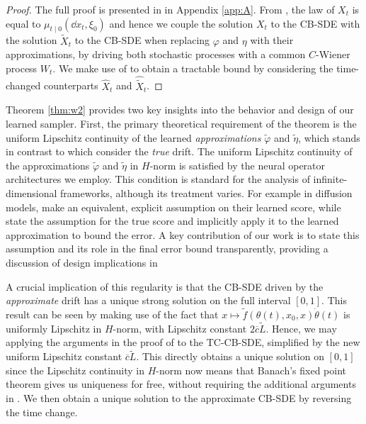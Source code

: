 \begin{proof} The full proof is presented in  in Appendix \ref{app:A}. From , the law of \(X_{t}\) is equal to \(\mu_{t \mid 0}(\dd{x_{t}}, \xi_{0})\) and hence we couple the solution \(X_{t}\) to the CB-SDE with the solution \(\widetilde{X}_{t}\) to the CB-SDE when replacing \(\varphi\) and \(\eta\) with their approximations, by driving both stochastic processes with a common \(C\)-Wiener process \(W_{t}\). We make use of  to obtain a tractable bound by considering the time-changed counterparts \(\hat{X}_{t}\) and \(\hat{\widetilde{X}}_{t}\).
\end{proof}

Theorem \ref{thm:w2} provides two key insights into the behavior and design of our learned sampler. First, the primary theoretical requirement of the theorem is the uniform Lipschitz continuity of the  learned \textit{approximations} \(\widetilde{\varphi}\) and \(\widetilde{\eta}\), which stands in contrast to  which consider the \textit{true} drift. The uniform Lipschitz continuity of the approximations \(\widetilde{\varphi}\) and \(\widetilde{\eta}\) in \(H\)-norm is satisfied by the neural operator architectures we employ. This condition is standard for the analysis of infinite-dimensional frameworks, although its treatment varies.  For example in diffusion models, \citet{hagemann2023multilevel} make an equivalent, explicit assumption on their learned score, while \citet[Theorem 14]{pidstrigach2023infinite} state the assumption for the true score and implicitly apply it to the learned approximation to bound the error. A key contribution of our work is to state this assumption and its role in the final error bound transparently, providing a discussion of design implications in 

A crucial implication of this regularity is that the CB-SDE driven by the \textit{approximate} drift has a unique strong solution on the full interval \([0, 1]\). This result can be seen by making use of the fact that  \(x \mapsto \widetilde{f}(\theta(t), x_{0}, x)\dot{\theta}(t)\) is uniformly Lipschitz in \(H\)-norm, with Lipschitz constant \(2 \overline{c} \widetilde{L}\). Hence, we may applying the  arguments in the proof of  to the TC-CB-SDE, simplified by the new uniform Lipschitz constant \(\overline{c} \widetilde{L}\). This directly obtains a unique solution on \([0, 1]\) since the Lipschitz continuity in \(H\)-norm now means that Banach's fixed point theorem gives us uniqueness for free, without requiring the additional arguments in . We then obtain a unique solution to the approximate CB-SDE by reversing the time change. %


